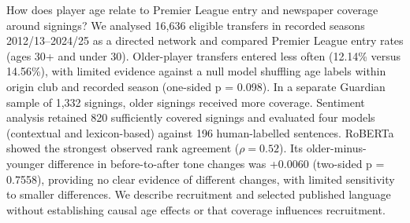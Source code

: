 How does player age relate to Premier League entry and newspaper coverage around signings? We analysed 16,636 eligible transfers in recorded seasons 2012/13--2024/25 as a directed network and compared Premier League entry rates (ages 30+ and under 30). Older-player transfers entered less often (12.14\% versus 14.56\%), with limited evidence against a null model shuffling age labels within origin club and recorded season (one-sided p = 0.098). In a separate Guardian sample of 1,332 signings, older signings received more coverage. Sentiment analysis retained 820 sufficiently covered signings and evaluated four models (contextual and lexicon-based) against 196 human-labelled sentences. RoBERTa showed the strongest observed rank agreement ($\rho = 0.52$). Its older-minus-younger difference in before-to-after tone changes was +0.0060 (two-sided p = 0.7558), providing no clear evidence of different changes, with limited sensitivity to smaller differences. We describe recruitment and selected published language without establishing causal age effects or that coverage influences recruitment.
